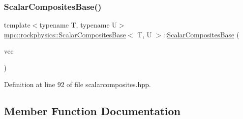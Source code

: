\subsubsection{\texorpdfstring{Scalar\+Composites\+Base()}{ScalarCompositesBase()}\hspace{0.1cm}{\footnotesize\ttfamily [2/2]}}
{\footnotesize\ttfamily template$<$typename T, typename U$>$ \\
\mbox{\hyperlink{classmpc_1_1rockphysics_1_1_scalar_composites_base}{mpc\+::rockphysics\+::\+Scalar\+Composites\+Base}}$<$ T, U $>$\+::\mbox{\hyperlink{classmpc_1_1rockphysics_1_1_scalar_composites_base}{Scalar\+Composites\+Base}} (\begin{DoxyParamCaption}\item[{const std\+::vector$<$ std\+::tuple$<$ \mbox{\hyperlink{structmpc_1_1rockphysics_1_1_bulk_modulus_type}{mpc\+::rockphysics\+::\+Bulk\+Modulus\+Type}}$<$ T $>$, \mbox{\hyperlink{structmpc_1_1rockphysics_1_1_shear_modulus_type}{mpc\+::rockphysics\+::\+Shear\+Modulus\+Type}}$<$ T $>$, \mbox{\hyperlink{structmpc_1_1rockphysics_1_1_density_type}{mpc\+::rockphysics\+::\+Density\+Type}}$<$ T $>$, \mbox{\hyperlink{structmpc_1_1rockphysics_1_1_volume_fraction_type}{mpc\+::rockphysics\+::\+Volume\+Fraction\+Type}}$<$ T $>$ $>$ $>$ \&}]{vec }\end{DoxyParamCaption})\hspace{0.3cm}{\ttfamily [inline]}}



Definition at line 92 of file scalarcomposites.\+hpp.



\subsection{Member Function Documentation}
\mbox{\label{classmpc_1_1rockphysics_1_1_scalar_composites_base_a946f9e52e72eb9582c4cbe8ef971f815}} 
